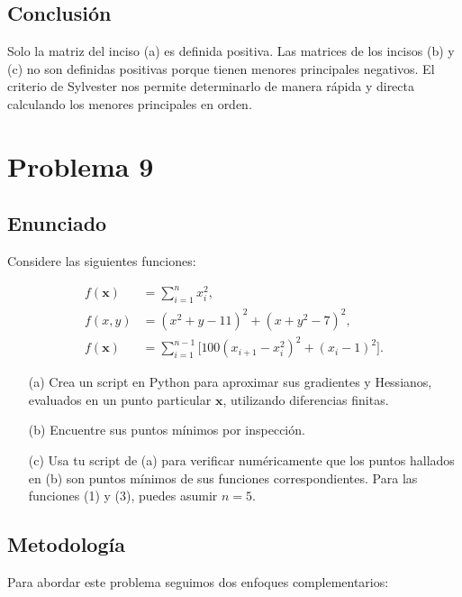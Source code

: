 \documentclass{article}
\begin{document}
\subsection{Conclusión}

Solo la matriz del inciso (a) es definida positiva. Las matrices de los incisos (b) y (c) no son definidas positivas porque tienen menores principales negativos. El criterio de Sylvester nos permite determinarlo de manera rápida y directa calculando los menores principales en orden.

\section{Problema 9}

\subsection{Enunciado}
\setcounter{equation}{0}
Considere las siguientes funciones:

\begin{align}
f(\mathbf{x}) &= \sum_{i=1}^{n} x_i^{2}, \label{eq:1}\\
f(x,y) &= (x^{2}+y-11)^{2} + (x+y^{2}-7)^{2}, \label{eq:2}\\
f(\mathbf{x}) &= \sum_{i=1}^{n-1} \bigl[100(x_{i+1}-x_i^{2})^{2} + (x_i-1)^{2}\bigr]. \label{eq:3}
\end{align}

\begin{enumerate}
  \item[(a)] Crea un script en Python para aproximar sus gradientes y Hessianos, evaluados en un punto particular $\mathbf{x}$, utilizando diferencias finitas.
  \item[(b)] Encuentre sus puntos mínimos por inspección.
  \item[(c)] Usa tu script de (a) para verificar numéricamente que los puntos hallados en (b) son puntos mínimos de sus funciones correspondientes. Para las funciones (1) y (3), puedes asumir $n=5$.
\end{enumerate}

\subsection{Metodología}

Para abordar este problema seguimos dos enfoques complementarios:
\end{document}
